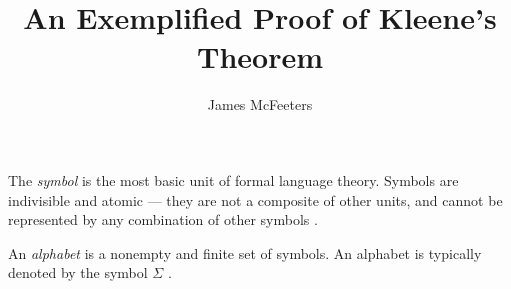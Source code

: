 \documentclass{bcthesis}
\title{An Exemplified Proof of Kleene's Theorem}
\author{James McFeeters}
\newif\ifbuildfrontmatter
\renewcommand{\meo}[1]{}
\newcommand{\footcite}[2]{\xspace\cite[pg.~{#2}]{#1}\xspace}
\begin{document}
\ifbuildfrontmatter
\frontmatter

	\maketitle

	\begin{abstract}
		\meo{This is a placeholder abstract!}

		This paper provides a proof of Kleene's Theorem accompanied by definitions and examples for newcomers to formal language theory.

		Kleene's theorem is a result from formal language theory that provides the mathematical foundation for ubiquitous regular expression search programs.
		Regular expression string matching can be found in a wide variety of software, from compilers to word processors. 
		The speed and power of regular expression string matching are direct results of the relationship between the regular languages and finite automata established by this theorem.
		

		\meo{This is a placeholder abstract!}
	\end{abstract}


	\begin{acknowledgments}
		Here you should acknowledge any special help on your project, or particular influences on your life or mathematical development.
	\end{acknowledgments}

	\tableofcontents
\fi

\mainmatter

\label{ch:basics}

		\begin{definition}[Symbol]
			The \textit{symbol} is the most basic unit of formal language theory.
			Symbols are indivisible and atomic --- they are not a composite of other units, and cannot be represented by any combination of other symbols \footcite{hopcroft}{1}.
		\end{definition}

		\begin{definition}[Alphabet]
			An \textit{alphabet} is a nonempty and finite set of symbols.
			An alphabet is typically denoted by the symbol $\Sigma$ \footcite{salomaa}{1}.
		\end{definition}
\end{document}
